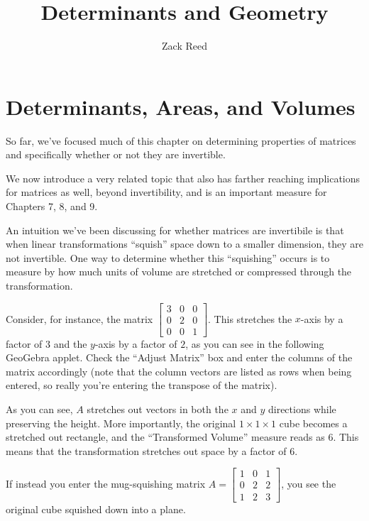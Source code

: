 \documentclass{ximera}
\author{Zack Reed}
\title{Determinants and Geometry}
\begin{document}
\begin{abstract}

\end{abstract}
\maketitle


\section*{Determinants, Areas, and Volumes}

So far, we've focused much of this chapter on determining properties of matrices and specifically whether or not they are invertible. 

We now introduce a very related topic that also has farther reaching implications for matrices as well, beyond invertibility, and is an important measure for Chapters 7, 8, and 9.

An intuition we've been discussing for whether matrices are invertibile is that when linear transformations ``squish'' space down to a smaller dimension, they are not invertible. One way to determine whether this ``squishing'' occurs is to measure by how much units of volume are stretched or compressed through the transformation. 

Consider, for instance, the matrix $\begin{bmatrix}
  3&0&0\\0&2&0\\0&0&1
\end{bmatrix}$. This stretches the $x$-axis by a factor of $3$ and the $y$-axis by a factor of $2$, as you can see in the following GeoGebra applet. Check the ``Adjust Matrix'' box and enter the columns of the matrix accordingly (note that the column vectors are listed as rows when being entered, so really you're entering the transpose of the matrix).

\begin{center}
\end{center}

As you can see, $A$ stretches out vectors in both the $x$ and $y$ directions while preserving the height. More importantly, the original $1\times1\times1$ cube becomes a stretched out rectangle, and the ``Transformed Volume'' measure reads as $6$. This means that the transformation stretches out space by a factor of $6$. 

If instead you enter the mug-squishing matrix $A=\begin{bmatrix}
  1&0&1\\0&2&2\\1&2&3
\end{bmatrix}$, you see the original cube squished down into a plane. 
\end{document}
